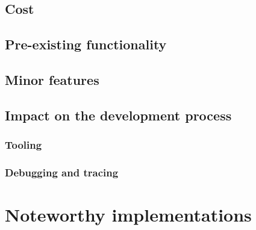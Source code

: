 \subsection{Cost}
\subsection{Pre-existing functionality}
\subsection{Minor features}
\subsection{Impact on the development process}
\subsubsection{Tooling}
\subsubsection{Debugging and tracing}


\section{Noteworthy implementations}